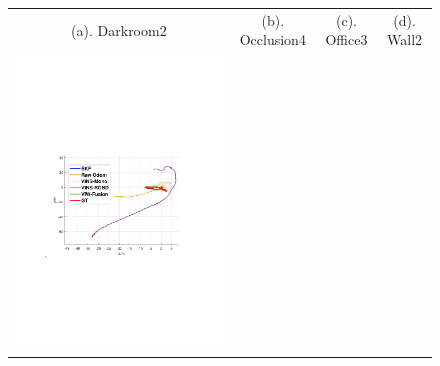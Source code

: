 \documentclass[conference]{IEEEtran}
\begin{document}
\begin{figure}
\begin{center}
\begin{tabular}{cccc}
				\\
				(a). Darkroom2 & (b). Occlusion4 & (c).  Office3 & (d).  Wall2\\
				\includegraphics[scale=0.26]{fig/motionblur3.pdf} &

\end{tabular}
\end{center}
\end{figure}
\end{document}
